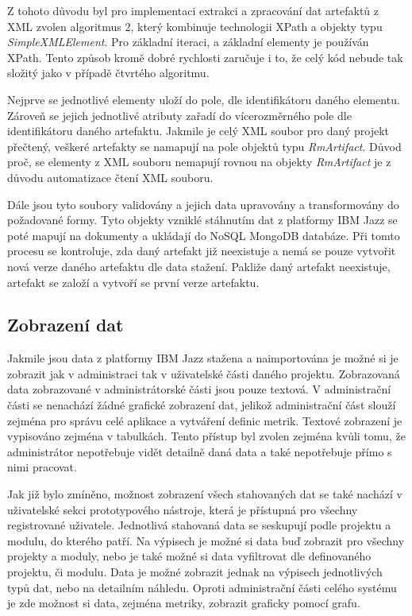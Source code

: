 \documentclass[czech,master,public,dept460,male,cpdeclaration,oneside]{diploma}
\begin{document}
Z tohoto důvodu byl pro implementaci extrakci a zpracování dat artefaktů z XML zvolen algoritmus 2, který kombinuje technologii XPath a objekty typu \textit{SimpleXMLElement}. Pro základní iteraci, a základní elementy je používán XPath. Tento způsob kromě dobré rychlosti zaručuje i to, že celý kód nebude tak složitý jako v případě čtvrtého algoritmu. 

Nejprve se jednotlivé elementy uloží do pole, dle identifikátoru daného elementu. Zároveň se jejich jednotlivé atributy zařadí do vícerozměrného pole dle identifikátoru daného artefaktu. Jakmile je celý XML soubor pro daný projekt přečtený, veškeré artefakty se namapují na pole objektů typu \textit{RmArtifact}. Důvod proč, se elementy z XML souboru nemapují rovnou na objekty \textit{RmArtifact} je z důvodu automatizace čtení XML souboru.

Dále jsou tyto soubory validovány a jejich data upravovány a transformovány do požadované formy. Tyto objekty vzniklé stáhnutím dat z platformy IBM Jazz se poté mapují na dokumenty a ukládají do NoSQL MongoDB databáze. Při tomto procesu se kontroluje, zda daný artefakt již neexistuje a nemá se pouze vytvořit nová verze daného artefaktu dle data stažení. Pakliže daný artefakt neexistuje, artefakt se založí a vytvoří se první verze artefaktu.

\subsection{Zobrazení dat}
Jakmile jsou data z platformy IBM Jazz stažena a naimportována je možné si je zobrazit jak v administraci tak v uživatelské části daného projektu. Zobrazovaná data zobrazované v administrátorské části jsou pouze textová. V administrační části se nenachází žádné grafické zobrazení dat, jelikož administrační část slouží zejména pro správu celé aplikace a vytváření definic metrik. Textové zobrazení je vypisováno zejména v tabulkách. Tento přístup byl zvolen zejména kvůli tomu, že administrátor nepotřebuje vidět detailně daná data a také nepotřebuje přímo s nimi pracovat.

Jak již bylo zmíněno, možnost zobrazení všech stahovaných dat se také nachází v uživatelské sekci prototypového nástroje, která je přístupná pro všechny registrované uživatele. Jednotlivá stahovaná data se seskupují podle projektu a modulu, do kterého patří. Na výpisech je možné si data buď zobrazit pro všechny projekty a moduly, nebo je také možné si data vyfiltrovat dle definovaného projektu, či modulu. Data je možné zobrazit jednak na výpisech jednotlivých typů dat, nebo na detailním náhledu. Oproti administrační části celého systému je zde možnost si data, zejména metriky, zobrazit graficky pomocí grafu. 
\end{document}

